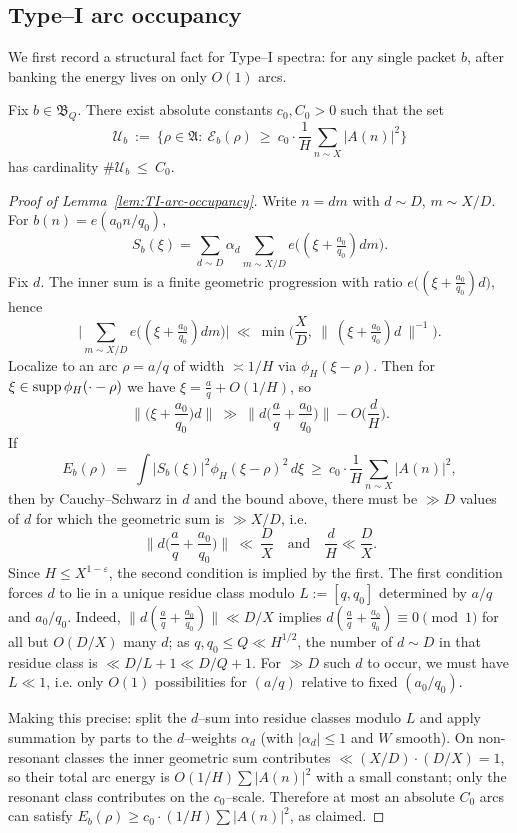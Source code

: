 \subsection{Type–I arc occupancy}

We first record a structural fact for Type–I spectra: for any single packet $b$, after banking the energy lives on only $O(1)$ arcs.

\begin{lemma}\label{lem:TI-arc-occupancy}
\label{lem:typeI-occupancy}
Fix $b\in\mathfrak B_Q$. There exist absolute constants $c_0,C_0>0$ such that the set
\[
\mathcal U_b\ :=\ \Big\{\rho\in\mathfrak A:\ \mathcal E_b(\rho)\ \ge\ c_0\cdot \frac{1}{H}\sum_{n\sim X} |A(n)|^2\Big\}
\]
has cardinality $\#\mathcal U_b\ \le\ C_0$.
\end{lemma}

\begin{proof}[Proof of Lemma~\ref{lem:TI-arc-occupancy}]
Write $n=dm$ with $d\sim D$, $m\sim X/D$. For $b(n)=e(a_0 n/q_0)$,
\[
S_b(\xi)=\sum_{d\sim D}\alpha_d\sum_{m\sim X/D} e\!\Big((\xi+\tfrac{a_0}{q_0})dm\Big).
\]
Fix $d$. The inner sum is a finite geometric progression with ratio $e\big((\xi+\tfrac{a_0}{q_0})d\big)$, hence
\[
\Big|\sum_{m\sim X/D} e\!\big((\xi+\tfrac{a_0}{q_0})dm\big)\Big|
\ \ll\ \min\!\Big(\frac{X}{D},\ \big\|\ (\xi+\tfrac{a_0}{q_0})d\ \big\|^{-1}\Big).
\]
Localize to an arc $\rho=a/q$ of width $\asymp 1/H$ via $\phi_H(\xi-\rho)$. Then for $\xi\in\operatorname{supp}\phi_H(\cdot-\rho)$ we have $\xi=\frac aq+O(1/H)$, so
\[
\Big\|\Big(\xi+\frac{a_0}{q_0}\Big)d\Big\| \ \gg\ \Big\| d\Big(\frac aq+\frac{a_0}{q_0}\Big)\Big\| - O\Big(\frac{d}{H}\Big).
\]
If
\[
E_b(\rho)\ =\ \int |S_b(\xi)|^2\phi_H(\xi-\rho)^2\,d\xi\ \ge\ c_0\cdot \frac1H\sum_{n\sim X}|A(n)|^2,
\]
then by Cauchy--Schwarz in $d$ and the bound above, there must be $\gg D$ values of $d$ for which the geometric sum is $\gg X/D$, i.e.
\[
\Big\| d\Big(\frac aq+\frac{a_0}{q_0}\Big)\Big\|\ \ll\ \frac{D}{X}\quad\text{and}\quad \frac dH\ll \frac{D}{X}.
\]
Since $H\le X^{1-\varepsilon}$, the second condition is implied by the first. The first condition forces $d$ to lie in a unique residue class modulo $L:=[q,q_0]$ determined by $a/q$ and $a_0/q_0$. Indeed, $\| d(\frac{a}{q}+\frac{a_0}{q_0})\|\ll D/X$ implies $d(\frac{a}{q}+\frac{a_0}{q_0})\equiv 0\pmod 1$ for all but $O(D/X)$ many $d$; as $q,q_0\le Q\ll H^{1/2}$, the number of $d\sim D$ in that residue class is $\ll D/L+1\ll D/Q + 1$. For $\gg D$ such $d$ to occur, we must have $L\ll 1$, i.e. only $O(1)$ possibilities for $(a/q)$ relative to fixed $(a_0/q_0)$.

Making this precise: split the $d$–sum into residue classes modulo $L$ and apply summation by parts to the $d$–weights $\alpha_d$ (with $|\alpha_d|\le 1$ and $W$ smooth). On non-resonant classes the inner geometric sum contributes $\ll (X/D)\cdot (D/X)=1$, so their total arc energy is $O(1/H)\sum|A(n)|^2$ with a small constant; only the resonant class contributes on the $c_0$–scale. Therefore at most an absolute $C_0$ arcs can satisfy $E_b(\rho)\ge c_0 \cdot (1/H)\sum|A(n)|^2$, as claimed.
\end{proof}

